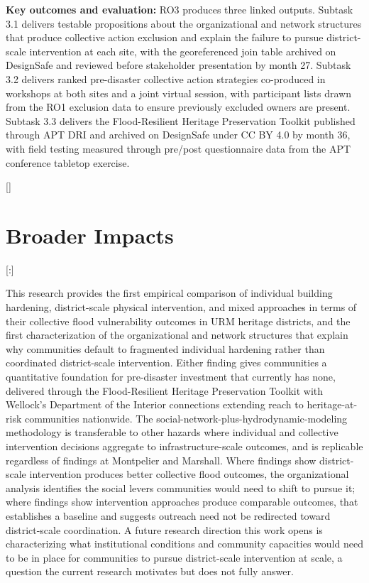 \documentclass[11pt]{article}
\newcommand{\customsection}[1]{%
  \titleformat{\section}[block]{\normalfont\bfseries}{\thesection}{1em}{}[]%
  \section{#1}%
  \titleformat{\section}[runin]{\normalfont\bfseries}{\thesection}{1em}{}[:]%
}
\begin{document}
\textbf{Key outcomes and evaluation:}
RO3 produces three linked outputs.
Subtask 3.1 delivers testable propositions about the organizational and network
structures that produce collective action exclusion and explain the failure to
pursue district-scale intervention at each site, with the georeferenced join table
archived on DesignSafe and reviewed before stakeholder presentation by month 27.
Subtask 3.2 delivers ranked pre-disaster collective action strategies co-produced
in workshops at both sites and a joint virtual session, with participant lists
drawn from the RO1 exclusion data to ensure previously excluded owners are present.
Subtask 3.3 delivers the Flood-Resilient Heritage Preservation Toolkit published
through APT DRI and archived on DesignSafe under CC BY 4.0 by month 36, with
field testing measured through pre/post questionnaire data from the APT conference
tabletop exercise.
\vspace{-0.4cm}
\customsection{Broader Impacts}
\vspace{-0.2cm}
This research provides the first empirical comparison of individual building
hardening, district-scale physical intervention, and mixed approaches in terms
of their collective flood vulnerability outcomes in URM heritage districts, and
the first characterization of the organizational and network structures that
explain why communities default to fragmented individual hardening rather than
coordinated district-scale intervention.
Either finding gives communities a quantitative foundation for pre-disaster
investment that currently has none, delivered through the Flood-Resilient Heritage
Preservation Toolkit with Wellock's Department of the Interior connections extending
reach to heritage-at-risk communities nationwide.
The social-network-plus-hydrodynamic-modeling methodology is transferable to other
hazards where individual and collective intervention decisions aggregate to
infrastructure-scale outcomes, and is replicable regardless of findings at
Montpelier and Marshall.
Where findings show district-scale intervention produces better collective flood
outcomes, the organizational analysis identifies the social levers communities
would need to shift to pursue it; where findings show intervention approaches
produce comparable outcomes, that establishes a baseline and suggests outreach
need not be redirected toward district-scale coordination.
A future research direction this work opens is characterizing what institutional
conditions and community capacities would need to be in place for communities to
pursue district-scale intervention at scale, a question the current research
motivates but does not fully answer.
\end{document}
